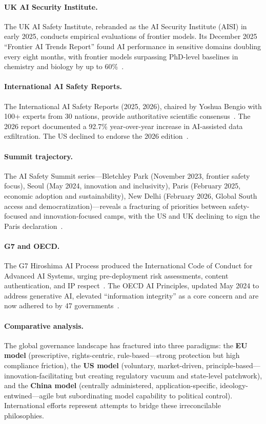 \paragraph{UK AI Security Institute.}
The UK AI Safety Institute, rebranded as the AI Security Institute (AISI) in early 2025, conducts empirical evaluations of frontier models. Its December 2025 ``Frontier AI Trends Report'' found AI performance in sensitive domains doubling every eight months, with frontier models surpassing PhD-level baselines in chemistry and biology by up to 60\%~\cite{aisi2025trends}.

\paragraph{International AI Safety Reports.}
The International AI Safety Reports (2025, 2026), chaired by Yoshua Bengio with 100+ experts from 30 nations, provide authoritative scientific consensus~\cite{aisafetyreport2025,aisafetyreport2026}. The 2026 report documented a 92.7\% year-over-year increase in AI-assisted data exfiltration. The US declined to endorse the 2026 edition~\cite{time2026usretreat}.

\paragraph{Summit trajectory.}
The AI Safety Summit series---Bletchley Park (November 2023, frontier safety focus), Seoul (May 2024, innovation and inclusivity), Paris (February 2025, economic adoption and sustainability), New Delhi (February 2026, Global South access and democratization)---reveals a fracturing of priorities between safety-focused and innovation-focused camps, with the US and UK declining to sign the Paris declaration~\cite{bletchley2023,seoul2024,paris2025}.

\paragraph{G7 and OECD.}
The G7 Hiroshima AI Process produced the International Code of Conduct for Advanced AI Systems, urging pre-deployment risk assessments, content authentication, and IP respect~\cite{hiroshima2023}. The OECD AI Principles, updated May 2024 to address generative AI, elevated ``information integrity'' as a core concern and are now adhered to by 47 governments~\cite{oecdai2024}.

\paragraph{Comparative analysis.}
The global governance landscape has fractured into three paradigms: the \textbf{EU model} (prescriptive, rights-centric, rule-based---strong protection but high compliance friction), the \textbf{US model} (voluntary, market-driven, principle-based---innovation-facilitating but creating regulatory vacuum and state-level patchwork), and the \textbf{China model} (centrally administered, application-specific, ideology-entwined---agile but subordinating model capability to political control). International efforts represent attempts to bridge these irreconcilable philosophies.


